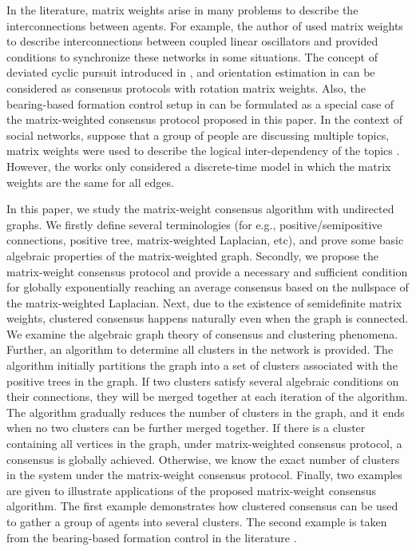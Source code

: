 \documentclass[draftclsnofoot,11pt,onecolumn]{IEEEtran}
\begin{document}
In the literature, matrix weights arise in many problems to describe the interconnections between agents. For example, the author of \cite{Tuna2016aut} used matrix weights to describe interconnections between coupled linear oscillators and provided conditions to synchronize these networks in some situations. The concept of deviated cyclic pursuit introduced in \cite{ramirez2009distributed}, and orientation estimation in \cite{lee2016aut,ahn2017consensus} can be considered as consensus protocols with rotation matrix weights. Also, the bearing-based formation control setup in \cite{Zhao2015CDC} can be formulated as a special case of the matrix-weighted consensus protocol proposed in this paper. In the context of social networks, suppose that a group of people are discussing multiple topics, matrix weights were used to describe the logical inter-dependency of the topics \cite{friedkin2016network,parsegov2017novel}. However, the works \cite{friedkin2016network,parsegov2017novel} only considered a discrete-time model in which the matrix weights are the same for all edges.

In this paper, we study the matrix-weight consensus algorithm with  undirected graphs. We firstly define several terminologies (for e.g., positive/semipositive connections, positive tree, matrix-weighted Laplacian, etc), and prove some basic algebraic properties of the matrix-weighted graph. Secondly, we propose the matrix-weight consensus protocol and provide a necessary and sufficient condition for globally exponentially reaching an average consensus based on the nullspace of the matrix-weighted Laplacian. Next, due to the existence of semidefinite matrix weights, clustered consensus happens naturally even when the graph is connected. We examine the algebraic graph theory of consensus and clustering phenomena. Further, an algorithm to determine all clusters in the network is provided. The algorithm initially partitions the graph into a set of clusters associated with the positive trees in the graph. If two clusters satisfy several algebraic conditions on their connections, they will be merged together at each iteration of the algorithm. The algorithm gradually reduces the number of clusters in the graph, and it ends when no two  clusters can be further merged together. If there is a cluster containing all vertices in the graph, under matrix-weighted consensus protocol, a consensus is globally achieved. Otherwise, we know the exact number of clusters in the system under the matrix-weight consensus protocol. Finally, two examples are given to illustrate applications of the proposed matrix-weight consensus algorithm. The first example demonstrates how clustered consensus can be used to gather a group of agents into several clusters. The second example is taken from the bearing-based formation control in the literature \cite{Zhao2015CDC,Zhao2015CNS}.
\end{document}
